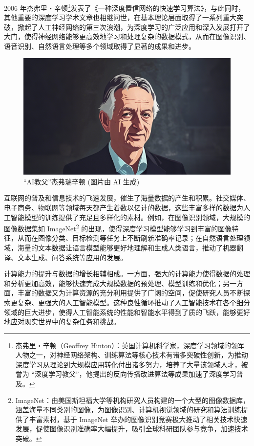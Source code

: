 2006 年杰弗里・辛顿\footnote{杰弗里・辛顿（Geoffrey Hinton）：英国计算机科学家，深度学习领域的领军人物之一，对神经网络架构、训练算法等核心技术有诸多突破性创新，为推动深度学习从理论到大规模应用转化付出诸多努力，培养了大量该领域人才，被誉为 “深度学习教父”，他提出的反向传播改进算法等成果加速了深度学习普及。}发表了《一种深度置信网络的快速学习算法》，与此同时，其他重要的深度学习学术文章也相继问世，在基本理论层面取得了一系列重大突破，掀起了人工神经网络的第三次浪潮，为深度学习的广泛应用和深入发展打开了大门，使得神经网络能够更高效地学习和处理复杂的数据模式，从而在图像识别、语音识别、自然语言处理等多个领域取得了显著的成果和进步。
\begin{figure}[htbp]
    \centering
    \includegraphics[width=0.75\linewidth]{image/1/Hinton.png}
    \caption{“AI教父”杰弗瑞辛顿 (图片由 AI 生成)}
\end{figure}


互联网的普及和信息技术的飞速发展，催生了海量数据的产生和积累。社交媒体、电子商务、物联网等领域每天都产生着数以亿计的数据，这些丰富多样的数据为人工智能模型的训练提供了充足且多样化的素材。例如，在图像识别领域，大规模的图像数据集如 ImageNet\footnote{ImageNet：由美国斯坦福大学等机构研究人员构建的一个大型的图像数据库，涵盖海量不同类别的图像，为图像识别、计算机视觉领域的研究和算法训练提供了丰富素材，基于 ImageNet 举办的图像识别竞赛极大推动了相关技术快速发展，促使图像识别准确率大幅提升，吸引全球科研团队参与竞争，加速技术突破。} 的出现，使得深度学习模型能够学习到丰富的图像特征，从而在图像分类、目标检测等任务上不断刷新准确率记录；在自然语言处理领域，海量的文本数据让语言模型能够更好地理解和生成人类语言，推动了机器翻译、文本生成、问答系统等应用的发展。


计算能力的提升与数据的增长相辅相成。一方面，强大的计算能力使得数据的处理和分析更加高效，能够快速完成大规模数据的预处理、模型训练和优化；另一方面，丰富的数据又为计算资源的充分利用提供了广阔的空间，促使研究人员不断探索更复杂、更强大的人工智能模型。这种良性循环推动了人工智能技术在各个细分领域的巨大进步，使得人工智能系统的性能和智能水平得到了质的飞跃，能够更好地应对现实世界中的复杂任务和挑战。


